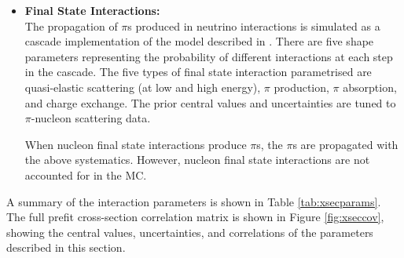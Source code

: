 \begin{itemize}
\item \textbf{Final State Interactions:} \\
The propagation of $\pi$s produced in neutrino interactions is simulated as a cascade implementation of the model described in \cite{fsicascade}. There are five shape parameters representing the probability of different interactions at each step in the cascade. The five types of final state interaction parametrised are quasi-elastic scattering (at low and high energy), $\pi$ production, $\pi$ absorption, and charge exchange. The prior central values and uncertainties are tuned to $\pi$-nucleon scattering data\cite{fsiscatt}.

When nucleon final state interactions produce $\pi$s, the $\pi$s are propagated with the above systematics. However, nucleon final state interactions are not accounted for in the MC.

\end{itemize}

A summary of the interaction parameters is shown in Table \ref{tab:xsecparams}. The full prefit cross-section correlation matrix is shown in Figure \ref{fig:xseccov}, showing the central values, uncertainties, and correlations of the parameters described in this section.

